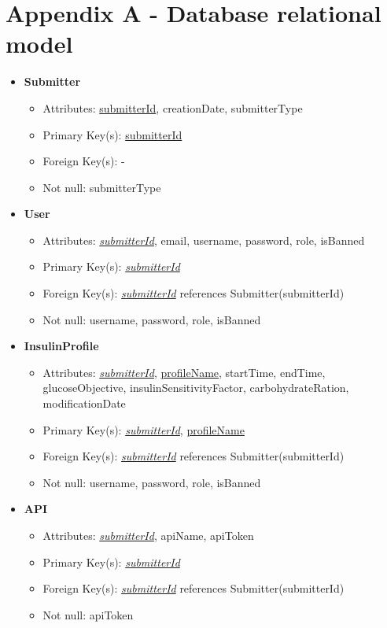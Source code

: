 \section*{Appendix A - Database relational model}
\label{app:relational_model}
    \begin{itemize}
        \item \textbf{Submitter}        
        \begin{itemize}
            \item Attributes: \underline{submitterId}, creationDate, submitterType
            \item Primary Key(s): \underline{submitterId}
            \item Foreign Key(s): -
            \item Not null: submitterType
        \end{itemize}

        \item \textbf{User}
        \begin{itemize}
            \item Attributes: \underline{\textit{submitterId}}, email, username, password, role, isBanned
            \item Primary Key(s): \underline{\textit{submitterId}}
            \item Foreign Key(s): \underline{\textit{submitterId}} references Submitter(submitterId)
            \item Not null: username, password, role, isBanned
        \end{itemize}

        \item \textbf{InsulinProfile}
        \begin{itemize}
            \item Attributes: \underline{\textit{submitterId}}, \underline{profileName}, startTime, endTime, glucoseObjective,
            insulinSensitivityFactor, carbohydrateRation, modificationDate
            \item Primary Key(s): \underline{\textit{submitterId}}, \underline{profileName}
            \item Foreign Key(s): \underline{\textit{submitterId}} references Submitter(submitterId)
            \item Not null: username, password, role, isBanned
        \end{itemize}

        \item \textbf{API}
        \begin{itemize}
            \item Attributes: \underline{\textit{submitterId}}, apiName, apiToken
            \item Primary Key(s): \underline{\textit{submitterId}}
            \item Foreign Key(s): \underline{\textit{submitterId}} references Submitter(submitterId)
            \item Not null: apiToken
        \end{itemize}


\end{itemize}
